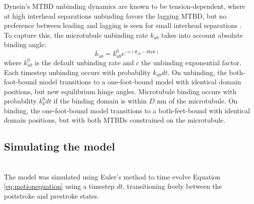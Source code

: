 \documentclass[9pt,twocolumn,twoside]{pnas-new}
\begin{document}
Dynein's MTBD unbinding dynamics are known to be tension-dependent, where at high interhead separations unbinding favors the lagging MTBD, but no preference between leading and lagging is seen for small interhead separations \cite{yildizpaper}. To capture this, the microtubule unbinding rate $k_{ub}$ takes into account absolute binding angle:
%
\begin{equation}
  k_{ub} = k_{ub}^0e^{-c\left(\theta_{xb}-\Theta{xb}\right)}
\end{equation}
%
where $k_{ub}^0$ is the default unbinding rate and $c$ the unbinding exponential factor. Each timestep unbinding occurs with probability $k_{ub}dt$. On unbinding, the both-foot-bound model transitions to a one-foot-bound model with identical domain positions, but new equilibrium hinge angles. Microtubule binding occurs with probability $k_{b}^0dt$ if the binding domain is within $D$ nm of the microtubule. On binding, the one-foot-bound model transitions to a both-feet-bound with identical domain positions, but with both MTBDs constrained on the microtubule.\\

\subsection*{Simulating the model}~\\
The model was simulated using Euler's method to time evolve Equation \ref{eq:motionequation} using a timestep $dt$, transitioning freely between the poststroke and prestroke states.
\end{document}
